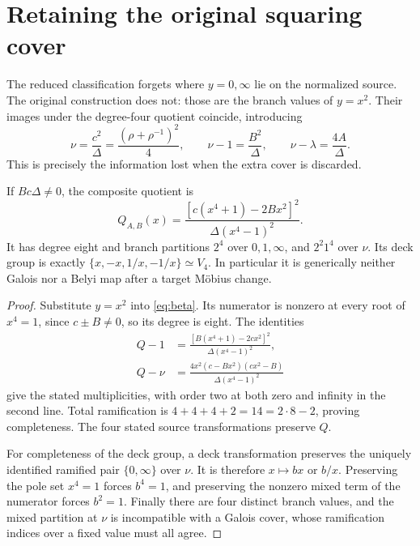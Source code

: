 \section{Retaining the original squaring cover}\label{sec:xcover}

The reduced classification forgets where \(y=0,\infty\) lie on the normalized source. The original construction does not: those are the branch values of \(y=x^2\). Their images under the degree-four quotient coincide, introducing
\begin{equation}\label{eq:nu}
\nu=\frac{c^2}{\Delta}=\frac{(\rho+\rho^{-1})^2}{4},\qquad
\nu-1=\frac{B^2}{\Delta},\qquad \nu-\lambda=\frac{4A}{\Delta}.
\end{equation}
This is precisely the information lost when the extra cover is discarded.

\begin{theorem}\label{thm:xcover}
If \(Bc\Delta\ne0\), the composite quotient is
\begin{equation}\label{eq:QAB}
Q_{A,B}(x)=\frac{[c(x^4+1)-2Bx^2]^2}{\Delta(x^4-1)^2}.
\end{equation}
It has degree eight and branch partitions \(2^4\) over \(0,1,\infty\), and \(2^2 1^4\) over \(\nu\). Its deck group is exactly \(\{x,-x,1/x,-1/x\}\simeq V_4\). In particular it is generically neither Galois nor a Belyi map after a target Möbius change.
\end{theorem}
\begin{proof}
Substitute \(y=x^2\) into \eqref{eq:beta}. Its numerator is nonzero at every root of \(x^4=1\), since \(c\pm B\ne0\), so its degree is eight. The identities
\begin{align}
Q-1&=\frac{[B(x^4+1)-2cx^2]^2}{\Delta(x^4-1)^2},\label{eq:Q1}\\
Q-\nu&=\frac{4x^2(c-Bx^2)(cx^2-B)}{\Delta(x^4-1)^2}\label{eq:Qnu}
\end{align}
give the stated multiplicities, with order two at both zero and infinity in the second line. Total ramification is \(4+4+4+2=14=2\cdot8-2\), proving completeness. The four stated source transformations preserve \(Q\).

For completeness of the deck group, a deck transformation preserves the uniquely identified ramified pair \(\{0,\infty\}\) over \(\nu\). It is therefore \(x\mapsto bx\) or \(b/x\). Preserving the pole set \(x^4=1\) forces \(b^4=1\), and preserving the nonzero mixed term of the numerator forces \(b^2=1\). Finally there are four distinct branch values, and the mixed partition at \(\nu\) is incompatible with a Galois cover, whose ramification indices over a fixed value must all agree.
\end{proof}

